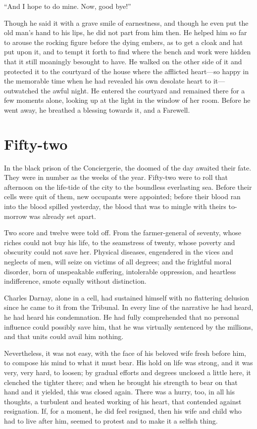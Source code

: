 ``And I hope to do mine.  Now, good bye!''

Though he said it with a grave smile of earnestness, and though he
even put the old man's hand to his lips, he did not part from him
then. He helped him so far to arouse the rocking figure before the
dying embers, as to get a cloak and hat put upon it, and to tempt it
forth to find where the bench and work were hidden that it still
moaningly besought to have.  He walked on the other side of it and
protected it to the courtyard of the house where the afflicted
heart---so happy in the memorable time when he had revealed his own
desolate heart to it---outwatched the awful night.  He entered the
courtyard and remained there for a few moments alone, looking up at
the light in the window of her room.  Before he went away, he
breathed a blessing towards it, and a Farewell.



\chapter{Fifty-two}


In the black prison of the Conciergerie, the doomed of the day
awaited their fate.  They were in number as the weeks of the year.
Fifty-two were to roll that afternoon on the life-tide of the city to
the boundless everlasting sea.  Before their cells were quit of them,
new occupants were appointed; before their blood ran into the blood
spilled yesterday, the blood that was to mingle with theirs to-morrow
was already set apart.

Two score and twelve were told off.  From the farmer-general of seventy,
whose riches could not buy his life, to the seamstress of twenty,
whose poverty and obscurity could not save her.  Physical diseases,
engendered in the vices and neglects of men, will seize on victims
of all degrees; and the frightful moral disorder, born of unspeakable
suffering, intolerable oppression, and heartless indifference,
smote equally without distinction.

Charles Darnay, alone in a cell, had sustained himself with
no flattering delusion since he came to it from the Tribunal.
In every line of the narrative he had heard, he had heard his condemnation.
He had fully comprehended that no personal influence could possibly save him,
that he was virtually sentenced by the millions, and that units could
avail him nothing.

Nevertheless, it was not easy, with the face of his beloved wife
fresh before him, to compose his mind to what it must bear.  His hold
on life was strong, and it was very, very hard, to loosen; by gradual
efforts and degrees unclosed a little here, it clenched the tighter
there; and when he brought his strength to bear on that hand and it
yielded, this was closed again.  There was a hurry, too, in all his
thoughts, a turbulent and heated working of his heart, that contended
against resignation.  If, for a moment, he did feel resigned, then
his wife and child who had to live after him, seemed to protest and
to make it a selfish thing.

